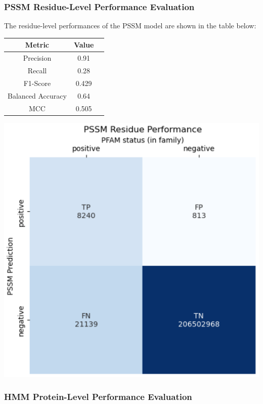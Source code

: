 \documentclass[10pt,twocolumn,letterpaper]{article}
\begin{document}
\subsubsection{PSSM Residue-Level Performance Evaluation}

The residue-level performances of the PSSM model are shown in the table below:


\begin{center}
    \begin{tabular}{ccc}
        \toprule
        Metric & Value \\
        \midrule
        Precision & 0.91 \\
        Recall & 0.28 \\
        F1-Score & 0.429 \\
        Balanced Accuracy & 0.64 \\
        MCC & 0.505 \\
        \bottomrule
    \end{tabular}
\end{center} 

\begin{center}
    \includegraphics[scale=0.45]{report/img/pssm_res_performance.png}
\end{center}

\subsubsection{HMM Protein-Level Performance Evaluation}
\end{document}
